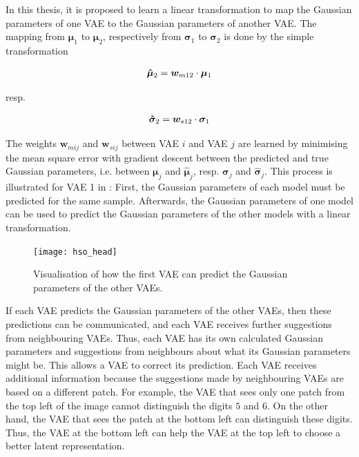In this thesis, it is proposed to learn a linear transformation to map the Gaussian parameters of one VAE to the Gaussian parameters of another VAE. The mapping from $\boldsymbol{\mu}_1$ to $\boldsymbol{\mu}_2$, respectively from $\boldsymbol{\sigma}_1$ to $\boldsymbol{\sigma}_2$ is done by the simple transformation

\begin{align}\eqlbl{hso_7}
	\boldsymbol{\hat{\mu}}_2 = \boldsymbol{w}_{m12} \cdot \boldsymbol{\mu}_1
\end{align}

resp.

\begin{align}\eqlbl{hso_8}
	\boldsymbol{\hat{\sigma}}_2 = \boldsymbol{w}_{s12} \cdot \boldsymbol{\sigma}_1
\end{align}

The weights $\boldsymbol{w}_{mij}$ and $\boldsymbol{w}_{sij}$ between VAE $i$ and VAE $j$ are learned by minimising the mean square error with gradient descent between the predicted and true Gaussian parameters, i.e. between $\boldsymbol{\mu}_j$ and $\boldsymbol{\hat{\mu}}_j$, resp. $\boldsymbol{\sigma}_j$ and $\boldsymbol{\hat{\sigma}}_j$. This process is illustrated for VAE 1 in : First, the Gaussian parameters of each model must be predicted for the same sample. Afterwards, the Gaussian parameters of one model can be used to predict the Gaussian parameters of the other models with a linear transformation.

\begin{figure}[h]
    \centering
    \texttt{[image: hso\_head]}
    \caption[Prediction of Gaussian parameters of other VAEs]{Visualisation of how the first VAE can predict the Gaussian parameters of the other VAEs.}
\end{figure}

If each VAE predicts the Gaussian parameters of the other VAEs, then these predictions can be communicated, and each VAE receives further suggestions from neighbouring VAEs. Thus, each VAE has its own calculated Gaussian parameters and suggestions from neighbours about what its Gaussian parameters might be. This allows a VAE to correct its prediction. Each VAE receives additional information because the suggestions made by neighbouring VAEs are based on a different patch. For example, the VAE that sees only one patch from the top left of the image cannot distinguish the digits $5$ and $6$. On the other hand, the VAE that sees the patch at the bottom left can distinguish these digits. Thus, the VAE at the bottom left can help the VAE at the top left to choose a better latent representation.


